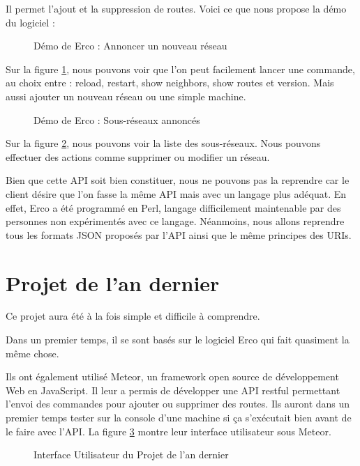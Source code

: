 Il permet l'ajout et la suppression de routes. Voici ce que nous propose la démo du logiciel \cite{Erc16} :

\begin{figure}[H]
\caption{Démo de Erco : Annoncer un nouveau réseau}
\label{fig:erco_demo_announce}
\end{figure}

Sur la figure \ref{fig:erco_demo_announce}, nous pouvons voir que l'on peut facilement lancer une commande, au choix entre : reload, restart, show neighbors, show routes et version. Mais aussi ajouter un nouveau réseau ou une simple machine.

\begin{figure}[H]
\caption{Démo de Erco : Sous-réseaux annoncés}
\label{fig:erco_announced}
\end{figure}

Sur la figure \ref{fig:erco_announced}, nous pouvons voir la liste des sous-réseaux. Nous pouvons effectuer des actions comme supprimer ou modifier un réseau.

Bien que cette API soit bien constituer, nous ne pouvons pas la reprendre car le client désire que l'on fasse la même API mais avec un langage plus adéquat. En effet, Erco a été programmé en Perl, langage difficilement maintenable par des personnes non expérimentés avec ce langage. Néanmoins, nous allons reprendre tous les formats JSON proposés par l'API ainsi que le même principes des URIs.

\section{Projet de l'an dernier}
Ce projet aura été à la fois simple et difficile à comprendre.

Dans un premier temps, il se sont basés sur le logiciel Erco qui fait quasiment la même chose.

Ils ont également utilisé Meteor, un framework open source de développement Web en JavaScript.
Il leur a permis de développer une API restful permettant l'envoi des commandes pour ajouter ou supprimer des routes. Ils auront dans un premier temps tester sur la console d'une machine si ça s'exécutait bien avant de le faire avec l'API. La figure \ref{fig:meteor_route} montre leur interface utilisateur sous Meteor.

\begin{figure}[H]
\caption{Interface Utilisateur du Projet de l'an dernier}
\label{fig:meteor_route}
\end{figure}

